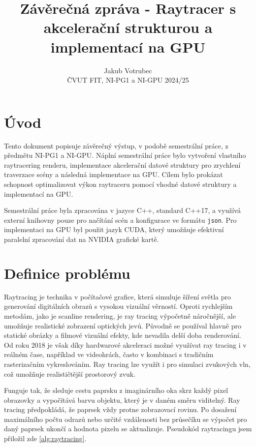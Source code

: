 \documentclass[10pt,a4paper]{article}
\title{\textbf{Závěrečná zpráva - Raytracer s akcelerační strukturou a implementací na GPU}}
\author{Jakub Votrubec \\
ČVUT FIT, NI-PG1 a NI-GPU 2024/25}
\date{}
\begin{document}
\maketitle


\section{Úvod}

Tento dokument popisuje závěrečný výstup, v podobě semestrální práce, z předmětu NI-PG1 a NI-GPU. Náplní semestrální práce bylo vytvoření vlastního raytracering renderu, implementace akcelerační datové struktury pro zrychlení traverzace scény a následná implementace na GPU. Cílem bylo prokázat schopnost optimalizovat výkon raytraceru pomocí vhodné datové struktury a implementací na GPU.

Semestrální práce byla zpracována v jazyce C++, standard C++17, a využívá externí knihovny pouze pro načítání scén a konfigurace ve formátu \texttt{json}. Pro implementaci na GPU byl použit jazyk CUDA, který umožňuje efektivní paralelní zpracování dat na NVIDIA grafické kartě.


\section{Definice problému}

Raytracing je technika v počítačové grafice, která simuluje šíření světla pro generování digitálních obrazů s vysokou vizuální věrností. Oproti rychlejším metodám, jako je scanline rendering, je ray tracing výpočetně náročnější, ale umožňuje realistické zobrazení optických jevů. Původně se používal hlavně pro statické obrázky a filmové vizuální efekty, kde nevadila delší doba renderování. Od roku 2018 je však díky hardwarové akceleraci možné využívat ray tracing i v reálném čase, například ve videohrách, často v kombinaci s tradičním rasterizačním vykreslováním. Ray tracing lze využít i pro simulaci zvukových vln, což umožňuje realističtější prostorový zvuk.

Funguje tak, že sleduje cestu paprsku z imaginárního oka skrz každý pixel obrazovky a vypočítává barvu objektu, který je v daném směru viditelný. Ray tracing předpokládá, že paprsek vždy protne zobrazovací rovinu. Po dosažení maximálního počtu odrazů nebo určité vzdálenosti bez průsečíku se výpočet pro daný paprsek ukončí a hodnota pixelu se aktualizuje. Pseudokód raytracingu jsem přiložil zde \ref{alg:raytracing}.
\end{document}
